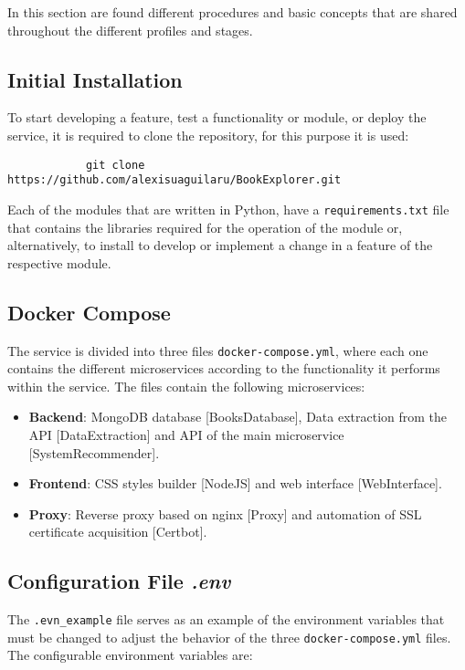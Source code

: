 \documentclass[12pt,a4paper]{article}
\begin{document}
    {
        In this section are found different procedures and basic concepts that 
        are shared throughout the different profiles and stages.

        \subsection{Initial Installation}
        {
            To start developing a feature, test a functionality or module, or 
            deploy the service, it is required to clone the repository, for 
            this purpose it is used:
            
            \begin{verbatim}
            git clone https://github.com/alexisuaguilaru/BookExplorer.git 
            \end{verbatim}

            Each of the modules that are written in Python, have a 
            \verb*|requirements.txt| file that contains the libraries required 
            for the operation of the module or, alternatively, to install to 
            develop or implement a change in a feature of the respective module.
        }

        \subsection{Docker Compose}
        {
            The service is divided into three files \verb*|docker-compose.yml|, 
            where each one contains the different microservices according to the 
            functionality it performs within the service. The files contain the 
            following microservices:

            \begin{itemize}[label=$\bullet$]
                \item \textbf{Backend}: MongoDB database [BooksDatabase], Data extraction 
                from the API [DataExtraction] and API of the main microservice [SystemRecommender].
                \item \textbf{Frontend}: CSS styles builder [NodeJS] and web interface [WebInterface].
                \item \textbf{Proxy}: Reverse proxy based on nginx [Proxy] and automation of SSL 
                certificate acquisition [Certbot].
            \end{itemize}
        }

        \subsection{Configuration File \emph{.env}}\label{sec:ConfEnv}
        {
            The \verb*|.evn_example| file serves as an example of the environment 
            variables that must be changed to adjust the behavior of the three 
            \verb*|docker-compose.yml| files. The configurable environment variables are:

}}
\end{document}

